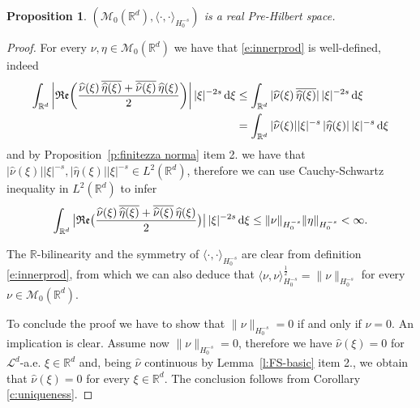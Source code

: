 \documentclass[12pt,a4paper,oneside]{amsart}
\theoremstyle{plain}
\newtheorem{proposition}[theorem]{Proposition}
\theoremstyle{definition}
\numberwithin{equation}{section}
\numberwithin{figure}{section}
\numberwithin{table}{section}
\theoremstyle{remark}
\newcommand{\R}{\mathbb{R}}
\newcommand{\dd}{\textup{d}}
\newcommand{\calM}{\mathcal{M}}
\newcommand{\Fhat}[1]{\widehat{#1}}
\begin{document}
\begin{proposition}
 $(\calM_0(\R^d), \langle \cdot , \cdot\rangle_{H^{-s}_0})$ is a real Pre-Hilbert space.   
\end{proposition}

\begin{proof}
 For every $\nu,\eta\in\calM_0(\R^d)$ we have that \eqref{e:innerprod} is well-defined, indeed
 \begin{align*}
    \int_{\R^d}\bigg|\mathfrak{Re}\bigg(\frac{\Fhat{\nu}(\xi)\,\overline{\Fhat{\eta}(\xi)}+\overline{\Fhat{\nu}(\xi)}\,{\Fhat{\eta}(\xi)}}{2}\bigg)\bigg|\,|\xi|^{-2s}\,\dd\xi&\leq  \int_{\R^d}|\Fhat{\nu}(\xi)\,\overline{\Fhat{\eta}(\xi)}|\,|\xi|^{-2s}\,\dd\xi\\ 
    &= \int_{\R^d}|\Fhat{\nu}(\xi)| |\xi|^{-s}\,|{\Fhat{\eta}(\xi)}|\,|\xi|^{-s}\,\dd\xi 
 \end{align*}
 and by Proposition~\ref{p:finitezza norma} item 2. we have that $|\Fhat{\nu}(\xi)| |\xi|^{-s}, |\Fhat{\eta}(\xi)| |\xi|^{-s} \in L^2(\R^d)$, therefore we can use Cauchy-Schwartz inequality in $L^2(\R^d)$ to infer
 \begin{equation*}
          \int_{\R^d}\big|\mathfrak{Re}\big(\frac{\Fhat{\nu}(\xi)\,\overline{\Fhat{\eta}(\xi)}+\overline{\Fhat{\nu}(\xi)}\,{\Fhat{\eta}(\xi)}}{2}\big)\big|\,|\xi|^{-2s}\,\dd\xi \leq \|\nu\|_{H^{-s}_0}\|\eta\|_{H^{-s}_0}<\infty.
 \end{equation*}

 The $\R$-bilinearity and the symmetry of $\langle \cdot , \cdot\rangle_{H^{-s}_0}$ are clear from definition \eqref{e:innerprod}, from which we can also deduce that $\langle \nu,\nu\rangle_{H^{-s}_0}^{\frac12}=\|\nu\|_{H^{-s}_0}$ for every $\nu\in \calM_0(\R^d)$.

 To conclude the proof we have to show that $\|\nu\|_{H^{-s}_0}=0$ if and only if $\nu=0$. An implication is clear. Assume now $\|\nu\|_{H^{-s}_0}=0$, therefore we have $\Fhat{\nu}(\xi)=0$ for $\mathcal{L}^d$-a.e. $\xi\in \R^d$ and, being $\Fhat{\nu}$ continuous by Lemma~\ref{l:FS-basic} item 2., we obtain that $\Fhat{\nu}(\xi)=0$ for every $\xi\in\R^d$. The conclusion follows from Corollary \ref{c:uniqueness}. 
\end{proof}
\end{document}
